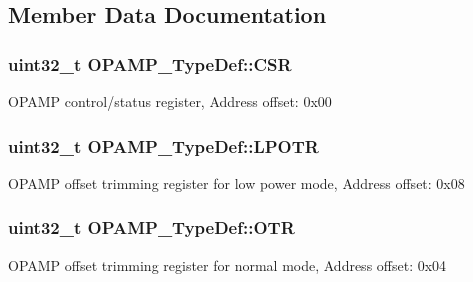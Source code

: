 \subsection{Member Data Documentation}
\hypertarget{struct_o_p_a_m_p___type_def_aa3123f8a6ca8605b6687b9ee3f11e8ef}{
\subsubsection[{C\-S\-R}]{ uint32\-\_\-t O\-P\-A\-M\-P\-\_\-\-Type\-Def\-::\-C\-S\-R}}\label{struct_o_p_a_m_p___type_def_aa3123f8a6ca8605b6687b9ee3f11e8ef}
O\-P\-A\-M\-P control/status register, Address offset\-: 0x00 \hypertarget{struct_o_p_a_m_p___type_def_a285131c897741d5290937f8f4f297e08}{
\subsubsection[{L\-P\-O\-T\-R}]{ uint32\-\_\-t O\-P\-A\-M\-P\-\_\-\-Type\-Def\-::\-L\-P\-O\-T\-R}}\label{struct_o_p_a_m_p___type_def_a285131c897741d5290937f8f4f297e08}
O\-P\-A\-M\-P offset trimming register for low power mode, Address offset\-: 0x08 \hypertarget{struct_o_p_a_m_p___type_def_a6a80544bc693d9c51045b3652c43fd22}{
\subsubsection[{O\-T\-R}]{ uint32\-\_\-t O\-P\-A\-M\-P\-\_\-\-Type\-Def\-::\-O\-T\-R}}\label{struct_o_p_a_m_p___type_def_a6a80544bc693d9c51045b3652c43fd22}
O\-P\-A\-M\-P offset trimming register for normal mode, Address offset\-: 0x04 

